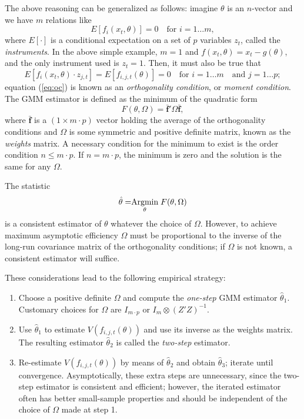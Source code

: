 The above reasoning can be generalized as follows: imagine $\theta$ is
an $n$-vector and we have $m$ relations like
\begin{equation}
  \label{eq:general}
  E \left[ f_i(x_t, \theta) \right] = 0 \quad\textrm{for\ } i=1 \ldots
  m ,
\end{equation}
where $E[\cdot]$ is a conditional expectation on a set of $p$
variables $z_t$, called the \emph{instruments}. In the above simple
example, $m=1$ and $f(x_t, \theta) = x_t - g(\theta)$, and the only
instrument used is $z_t = 1$. Then, it must also be true that
\begin{equation}
  \label{eq:oc}
  E \left[ f_i(x_t, \theta) \cdot z_{j,t} \right] = E \left[ f_{i,j,t}(\theta) \right] = 
  0 \quad\textrm{for\ } i=1 \ldots
  m \quad\textrm{and \ } j=1 \ldots p;
\end{equation}
equation (\ref{eq:oc}) is known as an \emph{orthogonality condition},
or \emph{moment condition}. The GMM estimator is defined as the
minimum of the quadratic form
\begin{equation}
  \label{eq:obj-general}
  F(\theta, \Omega) = \bar{\mathbf{f}}' \Omega \bar{\mathbf{f}},
\end{equation}
where $\bar{\mathbf{f}}$ is a $(1 \times m\cdot p)$ vector holding the
average of the orthogonality conditions and $\Omega$ is some symmetric
and positive definite matrix, known as the \emph{weights} matrix. A
necessary condition for the minimum to exist is the order condition $n
\le m \cdot p$. If $n = m \cdot p$, the minimum is zero and the
solution is the same for any $\Omega$.

The statistic
\begin{equation}
  \label{eq:gmmestimator}
  \hat{\theta} = \mathrel{\mathop{\mathrm{Argmin}}\limits_{\theta}} F(\theta, \Omega)
\end{equation}
is a consistent estimator of $\theta$ whatever the choice of $\Omega$.
However, to achieve maximum asymptotic efficiency $\Omega$ must be
proportional to the inverse of the long-run covariance matrix of the
orthogonality conditions; if $\Omega$ is not known, a consistent estimator
will suffice.

These considerations lead to the following empirical strategy:
\begin{enumerate}
\item Choose a positive definite $\Omega$ and compute the
  \emph{one-step} GMM estimator $\hat{\theta}_1$. Customary choices
  for $\Omega$ are $I_{m\cdot p}$ or $I_{m} \otimes (Z'Z)^{-1}$.
\item Use $\hat{\theta}_1$ to estimate $V(f_{i,j,t}(\theta))$ and use its
  inverse as the weights matrix. The resulting estimator
  $\hat{\theta}_2$ is called the \emph{two-step} estimator.
\item Re-estimate $V(f_{i,j,t}(\theta))$ by means of $\hat{\theta}_2$ and
  obtain $\hat{\theta}_3$; iterate until convergence. Asymptotically,
  these extra steps are unnecessary, since the two-step estimator is
  consistent and efficient; however, the iterated estimator often has
  better small-sample properties and should be independent of the
  choice of $\Omega$ made at step 1. 
\end{enumerate}

